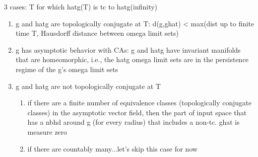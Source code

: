 \documentclass{article}
\newcounter{ct}
\begin{document}
3 cases:
T for which hatg(T) is tc to hatg(infinity)
\begin{enumerate}
\item g and hatg are topologically conjugate at T: d(g,ghat) < max(dist up to finite time T, Hausdorff distance between omega limit sets)
\item g has asymptotic behavior with CAs: g and hatg have invariant manifolds that are homeomorphic, i.e., the hatg omega limit sets are in the persistence regime of the g's omega limit sets
\item g and hatg are not topologically conjugate at T
\begin{enumerate}
\item if there are a finite number of equivalence classes (topologically conjugate classes) in the asymptotic vector field, then the part of input space that has a nbhd around g (for every radius) that includes a non-tc. ghat is measure zero
\item if there are countably many...let's skip this case for now
\end{enumerate}
\end{enumerate}




%
%
%
\end{document}
